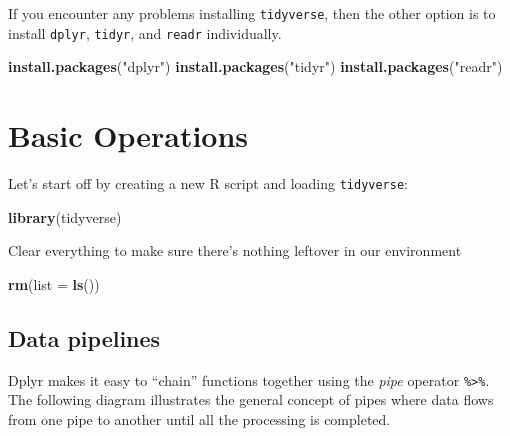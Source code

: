 \documentclass[]{article}
\newenvironment{Shaded}{\begin{snugshade}}{\end{snugshade}}
\newcommand{\KeywordTok}[1]{\textcolor[rgb]{0.13,0.29,0.53}{\textbf{{#1}}}}
\newcommand{\DataTypeTok}[1]{\textcolor[rgb]{0.13,0.29,0.53}{{#1}}}
\newcommand{\StringTok}[1]{\textcolor[rgb]{0.31,0.60,0.02}{{#1}}}
\newcommand{\NormalTok}[1]{{#1}}
\theoremstyle{definition}
\theoremstyle{definition}
\theoremstyle{definition}
\theoremstyle{remark}
\begin{document}
If you encounter any problems installing \texttt{tidyverse}, then the
other option is to install \texttt{dplyr}, \texttt{tidyr}, and
\texttt{readr} individually.

\begin{Shaded}
\begin{Highlighting}[]
\KeywordTok{install.packages}\NormalTok{(}\StringTok{"dplyr"}\NormalTok{)}
\KeywordTok{install.packages}\NormalTok{(}\StringTok{"tidyr"}\NormalTok{)}
\KeywordTok{install.packages}\NormalTok{(}\StringTok{"readr"}\NormalTok{)}
\end{Highlighting}
\end{Shaded}

\section{Basic Operations}\label{basic-operations}

Let's start off by creating a new R script and loading
\texttt{tidyverse}:

\begin{Shaded}
\begin{Highlighting}[]
\KeywordTok{library}\NormalTok{(tidyverse)}
\end{Highlighting}
\end{Shaded}

Clear everything to make sure there's nothing leftover in our
environment

\begin{Shaded}
\begin{Highlighting}[]
\KeywordTok{rm}\NormalTok{(}\DataTypeTok{list =} \KeywordTok{ls}\NormalTok{())}
\end{Highlighting}
\end{Shaded}

\subsection{Data pipelines}\label{data-pipelines}

Dplyr makes it easy to ``chain'' functions together using the
\emph{pipe} operator \texttt{\%\textgreater{}\%}. The following diagram
illustrates the general concept of pipes where data flows from one pipe
to another until all the processing is completed.
\end{document}
